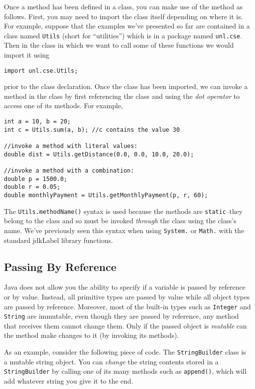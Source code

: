 Once a method has been defined in a class, you can make
use of the method as follows.  First, you may need to import
the class itself depending on where it is.  For example, suppose
that the examples we've presented so far are contained in a 
class named \texttt{Utils} (short for ``utilities'') which 
is in a package named \texttt{unl.cse}.  Then in the 
class in which we want to call some of these functions we would
import it using 

\texttt{import unl.cse.Utils;}

prior to the class declaration.  Once the class has been imported, 
we can invoke a method in the class by first referencing the class
and using the \emph{dot operator} to access one of its methods.
For example, 

\begin{verbatim}
int a = 10, b = 20;
int c = Utils.sum(a, b); //c contains the value 30

//invoke a method with literal values:
double dist = Utils.getDistance(0.0, 0.0, 10.0, 20.0);

//invoke a method with a combination:
double p = 1500.0;
double r = 0.05;
double monthlyPayment = Utils.getMonthlyPayment(p, r, 60);
\end{verbatim}

The \texttt{Utils.methodName()} syntax is used because
the methods are \texttt{static}--they belong to the class
and so must be invoked \emph{through} the class using the
class's name.  We've previously seen this syntax when using
\texttt{System.} or \texttt{Math.} with the
standard \gls{jdkLabel} library functions.

\subsection{Passing By Reference}

Java does not allow you the ability to specify if a variable
is passed by reference or by value.  Instead, all primitive types
are passed by value while all object types are passed by 
reference.  Moreover, most of the built-in types such as 
\texttt{Integer} and \texttt{String} are
immutable, even though they are passed by reference, any
method that receives them cannot change them.  Only
if the passed object is \emph{mutable} can the method
make changes to it (by invoking its methods).  

As an example, consider the following piece of code.  The
\texttt{StringBuilder} class is a mutable string
object.  You can \emph{change} the string contents stored
in a \texttt{StringBuilder} by calling one of its
many methods such as \texttt{append()}, which
will add whatever string you give it to the end.

